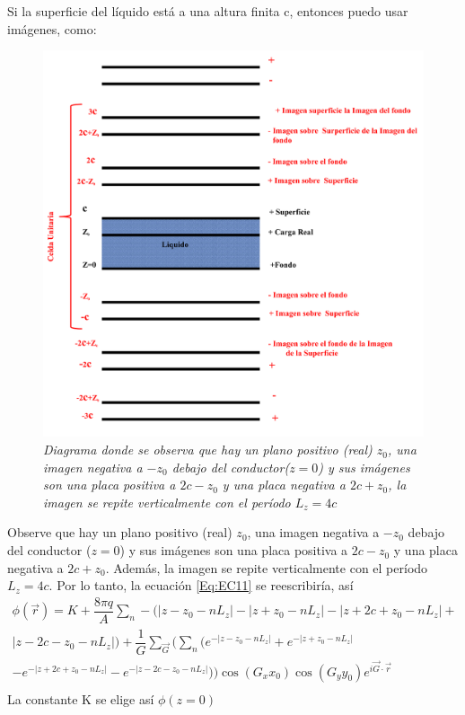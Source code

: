 \documentclass[a4paper,11pt,]{book}
\providecommand{\abs}[1]{\lvert#1\rvert}
\begin{document}
Si la superficie del líquido está a una altura finita c, entonces puedo usar imágenes, como:
\begin{figure}[H]
	\centering
	\includegraphics[scale=.35]{../Images/celd1}
	\caption{\emph{Diagrama donde se observa que hay un plano positivo (real) $ z_0 $, una imagen negativa a $ -z_0 $ debajo del conductor($z=0$)  y sus imágenes son una placa positiva a $ 2c-z_0 $ y una placa negativa a $ 2c + z_0 $, la imagen se repite  verticalmente con el período $ L_z = 4c $}}
\end{figure}
Observe que hay un plano positivo (real) $ z_0 $, una imagen negativa a $ -z_0 $ debajo del conductor ($z=0$) y sus imágenes son una placa positiva a $ 2c-z_0 $ y una placa negativa a $ 2c + z_0 $. Además, la imagen se repite  verticalmente con el período $ L_z = 4c $. Por lo tanto, la ecuación  \ref{Eq:EC11} se  reescribiría, así
{\small 
\begin{eqnarray}\label{Eq:EC12}
\nonumber\phi(\vec{r}) = K+\dfrac{8\pi q}{A} \displaystyle\sum_{n} -\bigg(\abs{z-z_0-nL_z}-\abs{z+z_0-nL_z}-\abs{z+2c+z_0-nL_z}+ \\ \nonumber \abs{z-2c-z_0-nL_z}\bigg) +  \dfrac{1}{G}\displaystyle\sum_{\vec{G}}\bigg( \displaystyle\sum_{n} \bigg( e^{-\abs{z-z_0-nL_z}} +e^{-\abs{z+z_0-nL_z}}\\ \nonumber -e^{-\abs{z+2c+z_0-nL_z}}-e^{-\abs{z-2c-z_0-nL_z}}  \bigg)\bigg)\cos(G_x x_0) \cos(G_y y_0) e^{i \vec{G} \cdot \vec{r}}\\
\end{eqnarray}
}
La constante K se elige así $ \phi(z=0)$
\end{document}
